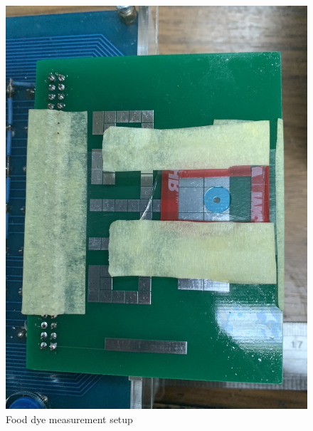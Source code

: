 \documentclass[conference]{IEEEtran}
\begin{document}
\begin{figure}[htbp]
    \centerline{\includegraphics[angle=90,scale=0.12]{dye-cartridge.jpg}}
    \caption{Food dye measurement setup}
    \label{dye_setup}
    \end{figure}
\end{document}
